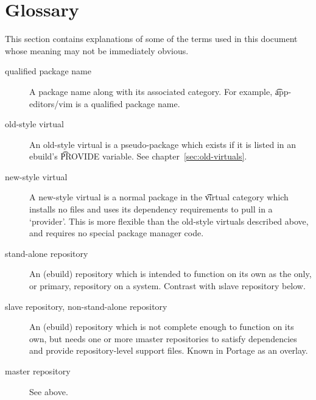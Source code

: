 \chapter{Glossary}
\label{sec:glossary}

This section contains explanations of some of the terms used in this document whose meaning may not
be immediately obvious.

\begin{description}
\item[qualified package name] A package name along with its associated category. For example,
    \t{app-editors/vim} is a qualified package name.
\item[old-style virtual] An old-style virtual is a pseudo-package which exists if it is listed in an
    ebuild's \t{PROVIDE} variable. See chapter~\ref{sec:old-virtuals}.
\item[new-style virtual] A new-style virtual is a normal package in the \t{virtual} category which
    installs no files and uses its dependency requirements to pull in a `provider'. This is more
    flexible than the old-style virtuals described above, and requires no special package manager
    code.
\item[stand-alone repository] An (ebuild) repository which is intended to function on its own as the
    only, or primary, repository on a system. Contrast with \i{slave repository} below.
\item[slave repository, non-stand-alone repository] An (ebuild) repository which is not complete
    enough to function on its own, but needs one or more \i{master repositories} to
    satisfy dependencies and provide repository-level support files. Known in Portage as an overlay.
\item[master repository] See above.

\end{description}


